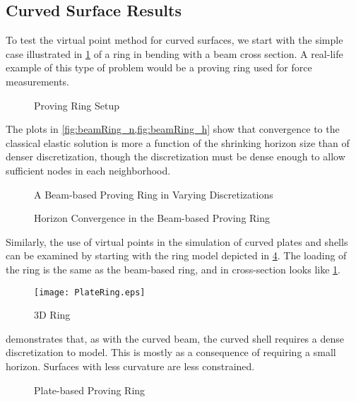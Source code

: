 \subsection{Curved Surface Results}
To test the virtual point method for curved surfaces, we start with the simple case illustrated in \cref{fig:ProvingRing} of a ring in bending with a beam cross section.
A real-life example of this type of problem would be a proving ring used for force measurements.
%
\begin{figure}[tbhp]
  \centering
  
  \caption{Proving Ring Setup}
  \label{fig:ProvingRing}
\end{figure}
%
The plots in \cref{fig:beamRing_n,fig:beamRing_h} show that convergence to the classical elastic solution is more a function of the shrinking horizon size than of denser discretization, though the discretization must be dense enough to allow sufficient nodes in each neighborhood.
%
\begin{figure}[tbhp]
  \centering
  \resizebox{0.8\linewidth}{!}{}
  \caption{A Beam-based Proving Ring in Varying Discretizations}
  \label{fig:beamRing_n}
\end{figure}
%
%
\begin{figure}[tbhp]
  \centering
  \resizebox{0.8\linewidth}{!}{}
  \caption{Horizon Convergence in the Beam-based Proving Ring}
  \label{fig:beamRing_h}
\end{figure}
%

Similarly, the use of virtual points in the simulation of curved plates and shells can be examined by starting with the ring model depicted in \cref{fig:PlateRing}.
The loading of the ring is the same as the beam-based ring, and in cross-section looks like \cref{fig:ProvingRing}.
%
\begin{figure}[h]
  \centering
  \texttt{[image: PlateRing.eps]}
  \caption{3D Ring}
  \label{fig:PlateRing}
\end{figure}
%

 demonstrates that, as with the curved beam, the curved shell requires a dense discretization to model.
This is mostly as a consequence of requiring a small horizon.
Surfaces with less curvature are less constrained.

%
\begin{figure}[tbhp]
  \centering
  \resizebox{0.8\linewidth}{!}{}
  \caption{Plate-based Proving Ring}
  \label{fig:PlateRing_n}
\end{figure}
%

